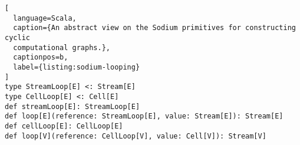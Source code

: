 \begin{lstlisting}[
  language=Scala,
  caption={An abstract view on the Sodium primitives for constructing cyclic
  computational graphs.},
  captionpos=b,
  label={listing:sodium-looping}
]
type StreamLoop[E] <: Stream[E]
type CellLoop[E] <: Cell[E]
def streamLoop[E]: StreamLoop[E]
def loop[E](reference: StreamLoop[E], value: Stream[E]): Stream[E]
def cellLoop[E]: CellLoop[E]
def loop[V](reference: CellLoop[V], value: Cell[V]): Stream[V]
\end{lstlisting}
